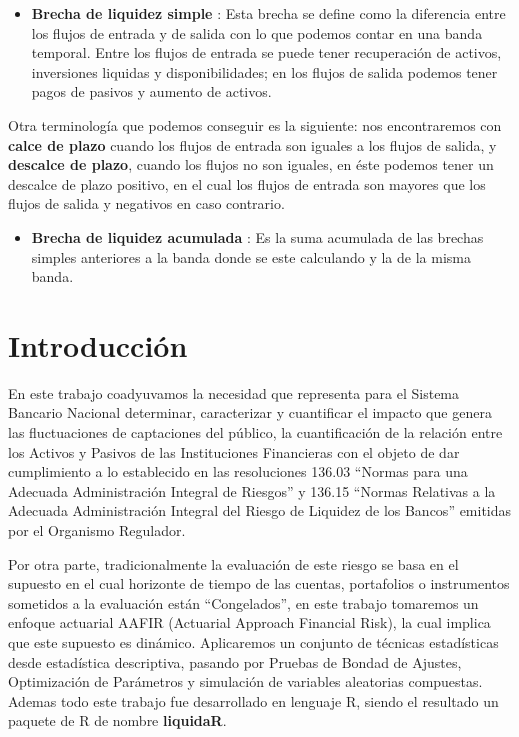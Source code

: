 \documentclass[]{article}
\providecommand{\tightlist}{%
  \setlength{\itemsep}{0pt}\setlength{\parskip}{0pt}}
\begin{document}
\begin{itemize}
\tightlist
\item
  \textbf{Brecha de liquidez simple} : Esta brecha se define como la
  diferencia entre los flujos de entrada y de salida con lo que podemos
  contar en una banda temporal. Entre los flujos de entrada se puede
  tener recuperación de activos, inversiones liquidas y
  disponibilidades; en los flujos de salida podemos tener pagos de
  pasivos y aumento de activos.
\end{itemize}

Otra terminología que podemos conseguir es la siguiente: nos
encontraremos con \textbf{calce de plazo} cuando los flujos de entrada
son iguales a los flujos de salida, y \textbf{descalce de plazo}, cuando
los flujos no son iguales, en éste podemos tener un descalce de plazo
positivo, en el cual los flujos de entrada son mayores que los flujos de
salida y negativos en caso contrario.

\begin{itemize}
\tightlist
\item
  \textbf{Brecha de liquidez acumulada} : Es la suma acumulada de las
  brechas simples anteriores a la banda donde se este calculando y la de
  la misma banda.
\end{itemize}

\hypertarget{introduccion}{%
\section{Introducción}\label{introduccion}}

En este trabajo coadyuvamos la necesidad que representa para el Sistema
Bancario Nacional determinar, caracterizar y cuantificar el impacto que
genera las fluctuaciones de captaciones del público, la cuantificación
de la relación entre los Activos y Pasivos de las Instituciones
Financieras con el objeto de dar cumplimiento a lo establecido en las
resoluciones 136.03 ``Normas para una Adecuada Administración Integral
de Riesgos'' y 136.15 ``Normas Relativas a la Adecuada Administración
Integral del Riesgo de Liquidez de los Bancos'' emitidas por el
Organismo Regulador.

Por otra parte, tradicionalmente la evaluación de este riesgo se basa en
el supuesto en el cual horizonte de tiempo de las cuentas, portafolios o
instrumentos sometidos a la evaluación están ``Congelados'', en este
trabajo tomaremos un enfoque actuarial AAFIR (Actuarial Approach
Financial Risk), la cual implica que este supuesto es dinámico.
Aplicaremos un conjunto de técnicas estadísticas desde estadística
descriptiva, pasando por Pruebas de Bondad de Ajustes, Optimización de
Parámetros y simulación de variables aleatorias compuestas. Ademas todo
este trabajo fue desarrollado en lenguaje R, siendo el resultado un
paquete de R de nombre \textbf{liquidaR}.
\end{document}
